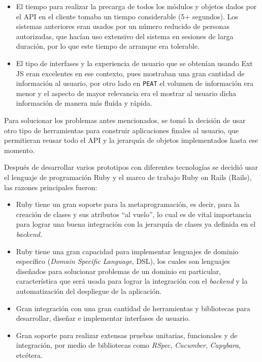 \begin{itemize}
\item El tiempo para realizar la precarga de todos los módulos y
  objetos dados por el API en el cliente tomaba un tiempo
  considerable (5+ segundos). Los sistemas anteriores eran usados
  por un número reducido de personas autorizadas, que hacían uso
  extensivo del sistema en sesiones de larga duración, por lo
  que este tiempo de arranque era tolerable.
\item El tipo de interfases y la experiencia de usuario que se obtenían
  usando Ext JS eran excelentes en ese contexto, pues mostraban una gran
  cantidad de información al usuario, por otro lado en \texttt{PEAT}
  el volumen de información era menor y el aspecto de mayor relevancia
  era el mostrar al usuario dicha información de manera más fluída y rápida.
\end{itemize}

Para solucionar los problemas antes mencionados, se tomó la decisión de
usar otro tipo de herramientas para construir aplicaciones finales al usuario,
que permitieran reusar todo el API y la jerarquía de objetos implementados
hasta ese momento.

Después de desarrollar varios prototipos con diferentes tecnologías se decidió
usar el lenguaje de programación Ruby y el marco de trabajo Ruby on Rails (Rails),
las razones principales fueron:

\begin{itemize}
\item Ruby tiene un gran soporte para la metaprogramación, es decir, para la
  creación de clases y sus atributos ``al vuelo'', lo cual es de vital
  importancia para lograr una buena integración con la jerarquía de clases
  ya definida en el \textit{backend}.
\item Ruby tiene una gran capacidad para implementar lenguajes de dominio
  específico (\textit{Domain Specific Language}, DSL), los cuales son lenguajes
  diseñados para solucionar problemas de un dominio en particular, característica
  que será usada para lograr la integración con el \textit{backend}
  y la automatización del despliegue de la aplicación.
\item Gran integración con una gran cantidad de herramientas y bibliotecas para
  desarrollar, diseñar e implementar interfases de usuario.
\item Gran soporte para realizar extensas pruebas unitarias, funcionales
  y de integración, por medio de bibliotecas como \textit{RSpec}, \textit{Cucumber},
  \textit{Capybara}, etcétera.
\end{itemize}

